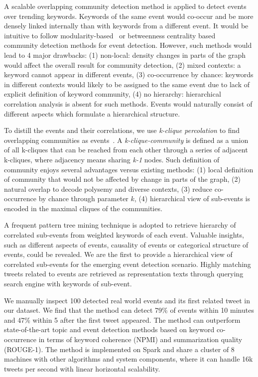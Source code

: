 A scalable overlapping community detection method is applied to detect events over trending keywords.
Keywords of the same event would co-occur and be more densely linked internally than with keywords from a different event.
It would be intuitive to follow modularity-based~\cite{weng2011event} or betweenness centrality based~\cite{sayyadi2013toit}
community detection methods for event detection.
However, such methods would lead to 4 major drawbacks:
(1) non-local: density changes in parts of the graph would affect the overall result for community detection,
(2) mixed contexts: a keyword cannot appear in different events,
(3) co-occurrence by chance: keywords in different contexts would likely to be assigned to the same event due to lack of explicit definition of keyword community,
(4) no hierarchy: hierarchical correlation analysis is absent for such methods.
Events would naturally consist of different aspects which formulate a hierarchical structure.

To distill the events and their correlations, 
we use \emph{k-clique percolation} to find overlapping communities as events~\cite{palla2005uncovering}.
A \emph{k-clique-community} is defined as a union of all k-cliques that can be reached from each other through a series of
adjacent k-cliques, where adjacency means sharing \emph{k-1} nodes.
Such definition of community enjoys several advantages versus existing methods:
(1) local definition of community that would not be affected by change in parts of the graph, 
(2) natural overlap to decode polysemy and diverse contexts, 
(3) reduce co-occurrence by chance through parameter $k$, 
(4) hierarchical view of sub-events is encoded in the maximal cliques of the communities.

A frequent pattern tree mining technique is adopted to retrieve hierarchy of correlated sub-events from weighted keywords of each event.
Valuable insights, such as different aspects of events, causality of events or categorical structure of events, could be revealed.
We are the first to provide a hierarchical view of correlated sub-events for the emerging event detection scenario.
Highly matching tweets related to events are retrieved as representation texts through querying search engine with keywords of sub-event.

We manually inspect 100 detected real world events and its first related tweet in our dataset.
We find that the method can detect 79\% of events within 10 minutes and 47\% within 5 after the first tweet appeared.
The method can outperform state-of-the-art topic and event detection methods based on keyword
co-occurrence \cite{weng2011event, sayyadi2013toit, yan2013biterm} in terms of keyword coherence (NPMI) and summarization quality (ROUGE-1).
The method is implemented on Spark and share a cluster of 8 machines
with other algorithms and system components, where it can handle 16k tweets per second with linear horizontal scalability.



